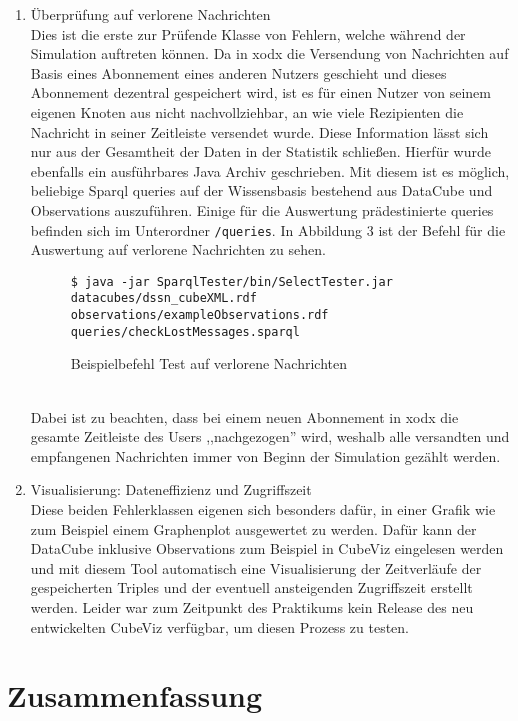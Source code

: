 \documentclass{article}
\begin{document}
\begin{enumerate}
{	}
	\item{Überprüfung auf verlorene Nachrichten\\
	Dies ist die erste zur Prüfende Klasse von Fehlern, welche während der Simulation auftreten können. Da in xodx die Versendung von Nachrichten auf Basis eines Abonnement eines anderen Nutzers geschieht und dieses Abonnement dezentral gespeichert wird, ist es für einen Nutzer von seinem eigenen Knoten aus nicht nachvollziehbar, an wie viele Rezipienten die Nachricht in seiner Zeitleiste versendet wurde. Diese Information lässt sich nur aus der Gesamtheit der Daten in der Statistik schließen. Hierfür wurde ebenfalls ein ausführbares Java Archiv geschrieben. Mit diesem ist es möglich, beliebige Sparql queries auf der Wissensbasis bestehend aus DataCube und Observations auszuführen. Einige für die Auswertung prädestinierte queries befinden sich im Unterordner \texttt{/queries}. In Abbildung 3 ist der Befehl für die Auswertung auf verlorene Nachrichten zu sehen.
	\begin{figure}[h]
	\centering
	\texttt{\$ java -jar SparqlTester/bin/SelectTester.jar datacubes/dssn\_cubeXML.rdf observations/exampleObservations.rdf queries/checkLostMessages.sparql}
	\caption{Beispielbefehl Test auf verlorene Nachrichten}
	\end{figure}\\
	Dabei ist zu beachten, dass bei einem neuen Abonnement in xodx die gesamte Zeitleiste des Users ,,nachgezogen'' wird, weshalb alle versandten und empfangenen Nachrichten immer von Beginn der Simulation gezählt werden.
	}
	\item{Visualisierung: Dateneffizienz und Zugriffszeit\\
	Diese beiden Fehlerklassen eigenen sich besonders dafür, in einer Grafik wie zum Beispiel einem Graphenplot ausgewertet zu werden. Dafür kann der DataCube inklusive Observations zum Beispiel in CubeViz eingelesen werden und mit diesem Tool automatisch eine Visualisierung der Zeitverläufe der gespeicherten Triples und der eventuell ansteigenden Zugriffszeit erstellt werden. Leider war zum Zeitpunkt des Praktikums kein Release des neu entwickelten CubeViz verfügbar, um diesen Prozess zu testen.	
	}
\end{enumerate}

\section{Zusammenfassung}
\end{document}
